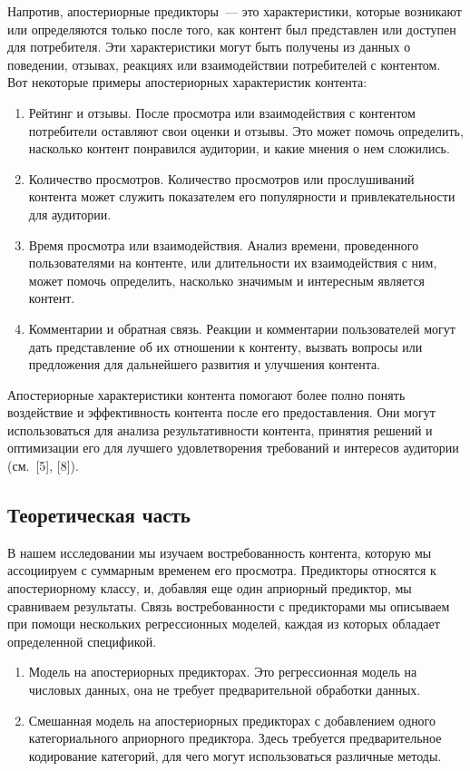 \documentclass[a4paper,12pt]{article}
\begin{document}
\medskip
Напротив, апостериорные предикторы~--- это характеристики, которые возникают или определяются только после того, как контент был представлен или доступен для потребителя. Эти характеристики могут быть получены из данных о поведении, отзывах, реакциях или взаимодействии потребителей с контентом. Вот некоторые примеры апостериорных характеристик контента:

\medskip
\begin{enumerate}
	\item Рейтинг и отзывы. После просмотра или взаимодействия с контентом потребители оставляют свои оценки и отзывы. Это может помочь определить, насколько контент понравился аудитории, и какие мнения о нем сложились.
	\item Количество просмотров. Количество просмотров или прослушиваний контента может служить показателем его популярности и привлекательности для аудитории.
	\item Время просмотра или взаимодействия. Анализ времени, проведенного пользователями на контенте, или длительности их взаимодействия с ним, может помочь определить, насколько значимым и интересным является контент.
	\item Комментарии и обратная связь. Реакции и комментарии пользователей могут дать представление об их отношении к контенту, вызвать вопросы или предложения для дальнейшего развития и улучшения контента.
\end{enumerate}

\medskip


Апостериорные характеристики контента помогают более полно понять воздействие и эффективность контента после его предоставления. Они могут использоваться для анализа результативности контента, принятия решений и оптимизации его для лучшего удовлетворения требований и интересов аудитории (см. [5], [8]).

\subsection{Теоретическая часть}
В нашем исследовании мы изучаем востребованность контента, которую мы ассоциируем с суммарным временем его просмотра. Предикторы относятся к апостериорному классу, и, добавляя еще один априорный предиктор, мы сравниваем результаты. 
Связь востребованности с предикторами мы описываем при помощи нескольких регрессионных моделей, каждая из которых обладает определенной спецификой.

\medskip
\begin{enumerate}
	\item Модель на апостериорных предикторах. Это регрессионная модель на числовых данных, она не требует предварительной обработки данных.
	\item Смешанная модель на апостериорных предикторах с добавлением одного категориального априорного предиктора. Здесь требуется предварительное кодирование категорий, для чего могут использоваться различные методы.
\end{enumerate}
\end{document}
